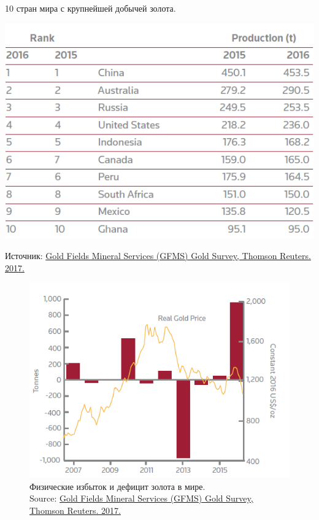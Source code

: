 \documentclass[_Banking_p3.tex]{subfiles}
\begin{document}
\begin{frame}{}
\begin{table}
	\centering
	\caption{10 стран мира с крупнейшей добычей золота.}
	\includegraphics[scale=0.5]{img/top_10_gold_mining_countries.png}
\label{tbl:top_10_gold_mining_countries}
\end{table}
Источник: \href{http://financial-risk-solutions.thomsonreuters.info/GFMS}{Gold Fields Mineral Services (GFMS) Gold Survey, Thomson Reuters. 2017.}
\end{frame}

\begin{frame}[shrink=20]
\begin{figure}	
	\centering
	\includegraphics[scale=0.7]{img/gold_fisical_surplus_deficit.png}
	\caption{Физические избыток и дефицит золота в мире. \\Source: \href{http://financial-risk-solutions.thomsonreuters.info/GFMS}{Gold Fields Mineral Services (GFMS) Gold Survey, Thomson Reuters. 2017.}}\label{fig:gold_fisical_surplus_deficit}
\end{figure}
\end{frame}
\end{document}
